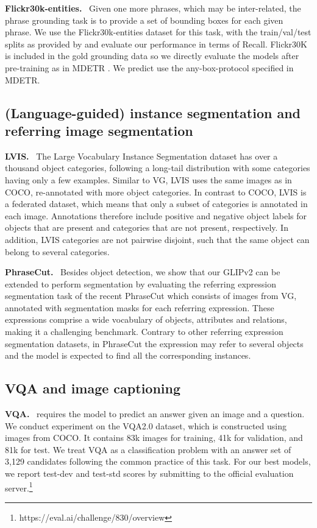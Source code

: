 \documentclass{article}
\begin{document}
\textbf{Flickr30k-entities.}~\cite{plummer2015flickr30k} Given one more phrases, which may be inter-related, the phrase grounding task is to provide a set of bounding boxes for each given phrase. We use the Flickr30k-entities dataset for this task, with the train/val/test splits as provided by \cite{li2021grounded} and evaluate our performance in terms of Recall. Flickr30K is included in the gold grounding data so we directly evaluate the models after pre-training as in MDETR \cite{kamath2021mdetr}. We predict use the any-box-protocol specified in MDETR.

\subsection{(Language-guided) instance segmentation and referring image segmentation}

\textbf{LVIS.}~\cite{gupta2019lvis} The Large Vocabulary Instance Segmentation dataset has over a thousand object categories, following a long-tail distribution with some categories having only a few examples. Similar to VG, LVIS uses the same images as in COCO, re-annotated with more object categories. In contrast to COCO, LVIS is a federated dataset, which means that only a subset of categories is annotated in each image. Annotations therefore include positive and negative object labels for objects that are present and categories that are not present, respectively. In addition, LVIS categories are not pairwise disjoint, such that the same object can belong to several categories.

\textbf{PhraseCut.}~\cite{wu2020phrasecut} Besides object detection, we show that our GLIPv2 can be extended to perform segmentation by evaluating the referring expression segmentation task of the recent PhraseCut\cite{wu2020phrasecut} which consists of images from VG, annotated
with segmentation masks for each referring expression. These expressions comprise a wide vocabulary of objects, attributes and relations, making it a challenging benchmark. Contrary to other referring expression segmentation datasets, in PhraseCut the expression may refer to several objects and the model is expected to find all the corresponding instances.  

\subsection{VQA and image captioning}
\textbf{VQA.}~\cite{goyal2017making} requires the model to predict an answer given an image and a question. We conduct experiment on the VQA2.0 dataset, which is constructed using images from COCO.  It contains 83k images for training, 41k for validation, and 81k for test. We treat VQA as a classification problem with an answer set of 3,129 candidates following the common practice of this task. For our best models, we report test-dev and test-std scores by submitting to the official evaluation server.\footnote{https://eval.ai/challenge/830/overview}
\end{document}
